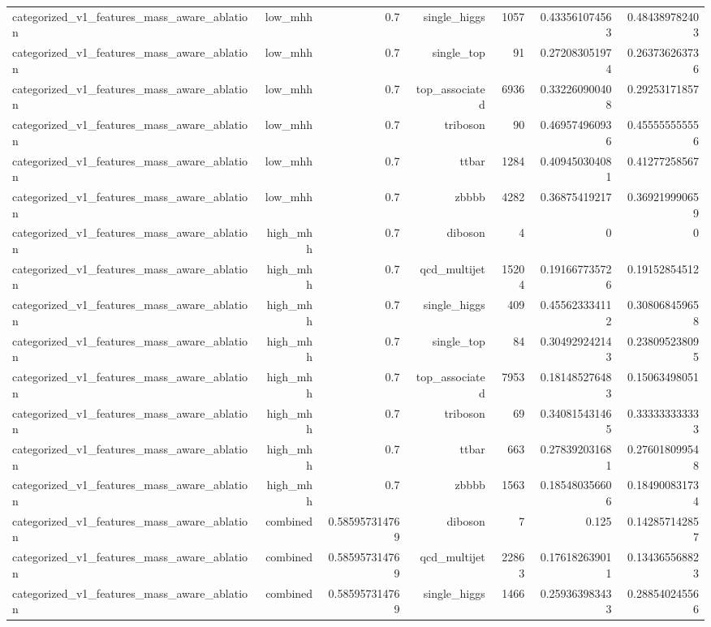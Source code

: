 \begin{table}[htbp]
{\begin{tabular}{lrrrrrr}
categorized\_v1\_features\_mass\_aware\_ablation & low\_mhh & 0.7 & single\_higgs & 1057 & 0.433561074563 & 0.484389782403 \\
categorized\_v1\_features\_mass\_aware\_ablation & low\_mhh & 0.7 & single\_top & 91 & 0.272083051974 & 0.263736263736 \\
categorized\_v1\_features\_mass\_aware\_ablation & low\_mhh & 0.7 & top\_associated & 6936 & 0.332260900408 & 0.29253171857 \\
categorized\_v1\_features\_mass\_aware\_ablation & low\_mhh & 0.7 & triboson & 90 & 0.469574960936 & 0.455555555556 \\
categorized\_v1\_features\_mass\_aware\_ablation & low\_mhh & 0.7 & ttbar & 1284 & 0.409450304081 & 0.41277258567 \\
categorized\_v1\_features\_mass\_aware\_ablation & low\_mhh & 0.7 & zbbbb & 4282 & 0.36875419217 & 0.369219990659 \\
categorized\_v1\_features\_mass\_aware\_ablation & high\_mhh & 0.7 & diboson & 4 & 0 & 0 \\
categorized\_v1\_features\_mass\_aware\_ablation & high\_mhh & 0.7 & qcd\_multijet & 15204 & 0.191667735726 & 0.19152854512 \\
categorized\_v1\_features\_mass\_aware\_ablation & high\_mhh & 0.7 & single\_higgs & 409 & 0.455623334112 & 0.308068459658 \\
categorized\_v1\_features\_mass\_aware\_ablation & high\_mhh & 0.7 & single\_top & 84 & 0.304929242143 & 0.238095238095 \\
categorized\_v1\_features\_mass\_aware\_ablation & high\_mhh & 0.7 & top\_associated & 7953 & 0.181485276483 & 0.15063498051 \\
categorized\_v1\_features\_mass\_aware\_ablation & high\_mhh & 0.7 & triboson & 69 & 0.340815431465 & 0.333333333333 \\
categorized\_v1\_features\_mass\_aware\_ablation & high\_mhh & 0.7 & ttbar & 663 & 0.278392031681 & 0.276018099548 \\
categorized\_v1\_features\_mass\_aware\_ablation & high\_mhh & 0.7 & zbbbb & 1563 & 0.185480356606 & 0.184900831734 \\
categorized\_v1\_features\_mass\_aware\_ablation & combined & 0.585957314769 & diboson & 7 & 0.125 & 0.142857142857 \\
categorized\_v1\_features\_mass\_aware\_ablation & combined & 0.585957314769 & qcd\_multijet & 22863 & 0.176182639011 & 0.134365568823 \\
categorized\_v1\_features\_mass\_aware\_ablation & combined & 0.585957314769 & single\_higgs & 1466 & 0.259363983433 & 0.288540245566 \\

\end{tabular}}
\end{table}
